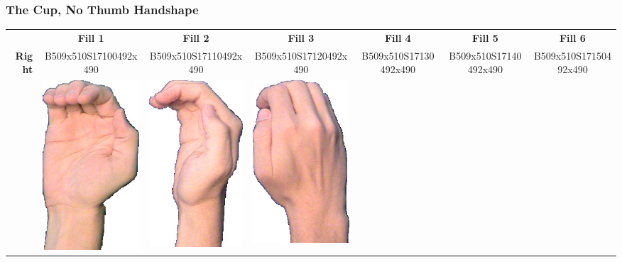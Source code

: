 \documentclass{article}
\begin{document}
\subsubsection{The Cup, No Thumb Handshape}

\begin{center}
\begin{tabular}{r*{6}{c}}
&\textbf{Fill 1}&\textbf{Fill 2}&\textbf{Fill 3}&\textbf{Fill 4}&\textbf{Fill 5}&\textbf{Fill 6}\\
\multirow{2}{*}{\textbf{Right}}&
B509x510S17100492x490&
B509x510S17110492x490&
B509x510S17120492x490&
B509x510S17130492x490&
B509x510S17140492x490&
B509x510S17150492x490\\
&
\includegraphics[scale=0.1]{images/05-16-1.jpg}&
\includegraphics[scale=0.1]{images/05-16-2.jpg}&
\includegraphics[scale=0.1]{images/05-16-3.jpg}&

\end{tabular}
\end{center}
\end{document}
